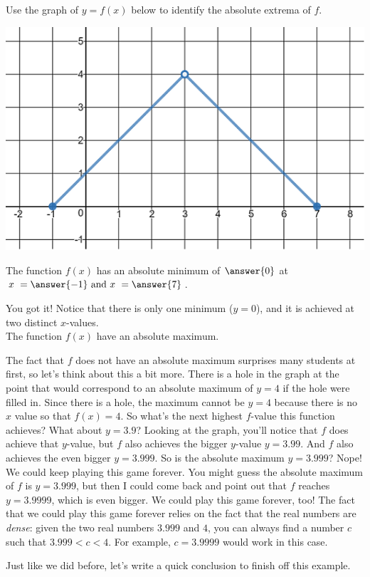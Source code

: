 \documentclass{ximera}
\begin{document}
\begin{exercise}
Use the graph of $y = f(x)$ below to identify the absolute extrema of $f$.

\begin{center} \includegraphics[scale=0.5]{extrema2new.png} \end{center}

The function $f(x)$ has an absolute minimum of $\answer{0}$ at $x \ = \answer{-1} \text{ and } x \ = \answer{7}$.  

\begin{exercise}
You got it!  Notice that there is only one minimum ($y=0$), and it is achieved at two distinct $x$-values.  \\

The function $f(x)$  have an absolute maximum.  

\begin{explanation}
The fact that $f$ does not have an absolute maximum surprises many students at first, so let's think about this a bit more.  There is a hole in the graph at the point that would correspond to an absolute maximum of $y=4$ if the hole were filled in.  Since there is a hole, the maximum cannot be $y=4$ because there is no $x$ value so that $f(x) = 4$.  So what's the next highest $f$-value this function achieves?  What about $y=3.9$?  Looking at the graph, you'll notice that $f$ does achieve that $y$-value, but $f$ also achieves the bigger $y$-value $y=3.99$.  And $f$ also achieves the even bigger $y=3.999$.  So is the absolute maximum $y=3.999$?  Nope!  We could keep playing this game forever.  You might guess the absolute maximum of $f$ is $y=3.999$, but then I could come back and point out that $f$ reaches $y=3.9999$, which is even bigger.  We could play this game forever, too!  The fact that we could play this game forever relies on the fact that the real numbers are \textit{dense}: given the two real numbers $3.999$ and $4$, you can always find a number $c$ such that $3.999 < c < 4$.  For example, $c = 3.9999$ would work in this case.  
\end{explanation}
\begin{exercise}
Just like we did before, let's write a quick conclusion to finish off this example. \\


\end{exercise}
\end{exercise}
\end{exercise}
\end{document}
